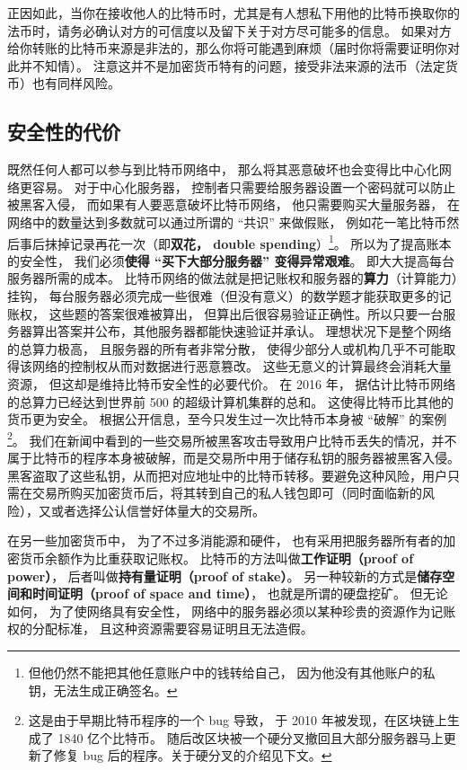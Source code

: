 正因如此，当你在接收他人的比特币时，尤其是有人想私下用他的比特币换取你的法币时，请务必确认对方的可信度以及留下关于对方尽可能多的信息。 如果对方给你转账的比特币来源是非法的，那么你将可能遇到麻烦（届时你将需要证明你对此并不知情）。 注意这并不是加密货币特有的问题，接受非法来源的法币（法定货币）也有同样风险。

\subsection{安全性的代价}
既然任何人都可以参与到比特币网络中， 那么将其恶意破坏也会变得比中心化网络更容易。 对于中心化服务器， 控制者只需要给服务器设置一个密码就可以防止被黑客入侵， 而如果有人要恶意破坏比特币网络， 他只需要购买大量服务器， 在网络中的数量达到多数就可以通过所谓的 “共识” 来做假账， 例如花一笔比特币然后事后抹掉记录再花一次（即\textbf{双花， double spending}）\footnote{但他仍然不能把其他任意账户中的钱转给自己， 因为他没有其他账户的私钥，无法生成正确签名。}。 所以为了提高账本的安全性， 我们必须\textbf{使得 “买下大部分服务器” 变得异常艰难}。 即大大提高每台服务器所需的成本。 比特币网络的做法就是把记账权和服务器的\textbf{算力}（计算能力）挂钩， 每台服务器必须完成一些很难（但没有意义）的数学题才能获取更多的记账权， 这些题的答案很难被算出， 但算出后很容易验证正确性。所以只要一台服务器算出答案并公布，其他服务器都能快速验证并承认。 理想状况下是整个网络的总算力极高， 且服务器的所有者非常分散， 使得少部分人或机构几乎不可能取得该网络的控制权从而对数据进行恶意篡改。 这些无意义的计算最终会消耗大量资源， 但这却是维持比特币安全性的必要代价。 在 2016 年， 据估计比特币网络的总算力已经达到世界前 500 的超级计算机集群的总和。 这使得比特币比其他的货币更为安全。 根据公开信息，至今只发生过一次比特币本身被 “破解” 的案例\footnote{这是由于早期比特币程序的一个 bug 导致， 于 2010 年被发现，在区块链上生成了 1840 亿个比特币。 随后改区块被一个硬分叉撤回且大部分服务器马上更新了修复 bug 后的程序。关于硬分叉的介绍见下文。}。 我们在新闻中看到的一些交易所被黑客攻击导致用户比特币丢失的情况，并不属于比特币的程序本身被破解，而是交易所中用于储存私钥的服务器被黑客入侵。 黑客盗取了这些私钥，从而把对应地址中的比特币转移。要避免这种风险，用户只需在交易所购买加密货币后，将其转到自己的私人钱包即可（同时面临新的风险），又或者选择公认信誉好体量大的交易所。

在另一些加密货币中， 为了不过多消能源和硬件， 也有采用把服务器所有者的加密货币余额作为比重获取记账权。 比特币的方法叫做\textbf{工作证明（proof of power）}， 后者叫做\textbf{持有量证明（proof of stake）}。 另一种较新的方式是\textbf{储存空间和时间证明（proof of space and time）}， 也就是所谓的硬盘挖矿。 但无论如何， 为了使网络具有安全性， 网络中的服务器必须以某种珍贵的资源作为记账权的分配标准， 且这种资源需要容易证明且无法造假。

